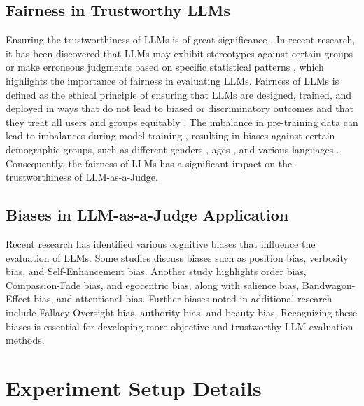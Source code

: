 \documentclass{article} %
\begin{document}
\subsection{Fairness in Trustworthy LLMs}
Ensuring the trustworthiness of LLMs is of great significance  \citet{liu2024trustworthyllmssurveyguideline, shi2024optimizationbasedpromptinjectionattack, huang2024obscurepromptjailbreakinglargelanguage, gao2024best, wu2024can}. In recent research, it has been discovered that LLMs may exhibit stereotypes against certain groups or make erroneous judgments based on specific statistical patterns \citep{Zhuo2023ExploringAE, Ferrara_2023, liu2024trustworthyllmssurveyguideline}, which highlights the importance of fairness in evaluating LLMs. Fairness of LLMs is defined as the ethical principle of ensuring that LLMs are designed, trained, and deployed in ways that do not lead to biased or discriminatory outcomes and that they treat all users and groups equitably \citep{sun2024trustllmtrustworthinesslargelanguage}. The imbalance in pre-training data can lead to imbalances during model training \citep{liu2024trustworthyllmssurveyguideline}, resulting in biases against certain demographic groups, such as different genders \citep{wan2023kellywarmpersonjoseph}, ages \citep{book}, and various languages \citep{jiao2023chatgptgoodtranslatoryes, bang2023multitaskmultilingualmultimodalevaluation}. Consequently, the fairness of LLMs has a significant impact on the trustworthiness of LLM-as-a-Judge.

\subsection{Biases in LLM-as-a-Judge Application}
Recent research has identified various cognitive biases that influence the evaluation of LLMs. Some studies \citep{zheng2024judging,shi2024judgingjudgessystematicinvestigation,wang2023largelanguagemodelsfair} discuss biases such as position bias, verbosity bias, and Self-Enhancement bias. Another study \citep{koo2023benchmarkingcognitivebiaseslarge} highlights order bias, Compassion-Fade bias, and egocentric bias, along with salience bias, Bandwagon-Effect bias, and attentional bias. Further biases noted in additional research \citep{chen2024humansllmsjudgestudy,stureborg2024largelanguagemodelsinconsistent} include Fallacy-Oversight bias, authority bias, and beauty bias. Recognizing these biases is essential for developing more objective and trustworthy LLM evaluation methods. 

\section{Experiment Setup Details}
\label{setup_details}
\end{document}
